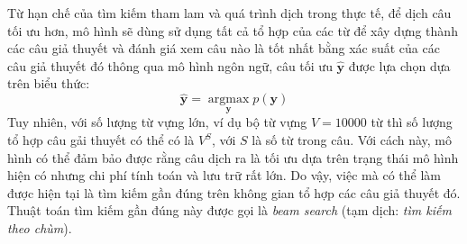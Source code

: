 Từ hạn chế của tìm kiếm tham lam và quá trình dịch trong thực tế, để dịch câu tối ưu hơn, mô hình sẽ dùng sử dụng tất cả tổ hợp của các từ để xây dựng thành các câu giả thuyết và đánh giá xem câu nào là tốt nhất bằng xác suất của các câu giả thuyết đó thông qua mô hình ngôn ngữ, câu tối ưu $\bm{\hat{y}}$ được lựa chọn dựa trên biểu thức:
\begin{equation*}
\bm{\hat{y}} = \operatorname*{argmax}_{\bm{y}} p(\bm{y})
\end{equation*}
Tuy nhiên, với số lượng từ vựng lớn, ví dụ bộ từ vựng $V = 10000$ từ thì số lượng tổ hợp câu gải thuyết có thể có là $V^S$, với $S$ là số từ trong câu. Với cách này, mô hình có thể đảm bảo được rằng câu dịch ra là tối ưu dựa trên trạng thái mô hình hiện có nhưng chi phí tính toán và lưu trữ rất lớn. Do vậy, việc mà có thể làm được hiện tại là tìm kiếm gần đúng trên không gian tổ hợp các câu giả thuyết đó. Thuật toán tìm kiếm gần đúng này được gọi là \textit{beam search} (tạm dịch: \textit{tìm kiếm theo chùm}).

